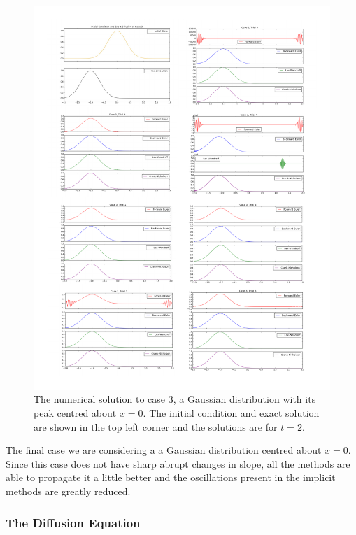 \documentclass[twocolumn]{article}
\begin{document}
\begin{figure}[ph]
	\includegraphics[width=\textwidth, trim=0 0 0 4.5cm]{case3}
	\caption{
		The numerical solution to case $3$, a Gaussian distribution with
		its peak centred about $x=0$. The initial condition and exact
		solution are shown in the top left corner and the solutions are
		for $t=2$.
	}
	\label{fig:case3}
\end{figure}

The final case we are considering a a Gaussian distribution centred
about $x=0$. Since this case does not have sharp abrupt changes in
slope, all the methods are able to propagate it a little better and
the oscillations present in the implicit methods are greatly reduced.

\subsubsection{The Diffusion Equation}
\end{document}
